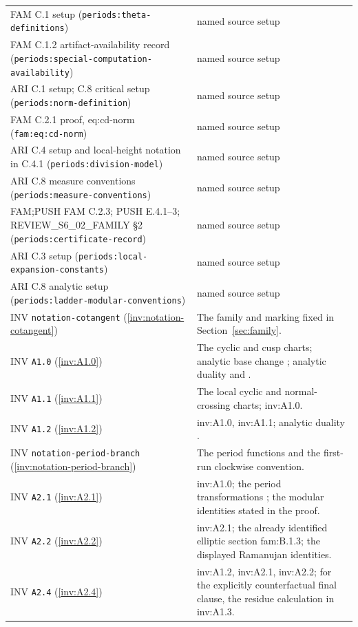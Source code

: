 \documentclass[11pt,a4paper]{article}
\theoremstyle{plain}
\theoremstyle{definition}
\begin{document}
\begin{longtable}{@{}L{.21\linewidth}L{.73\linewidth}@{}}
FAM C.1 setup (\nolinkurl{periods:theta-definitions}) & named source setup\\
FAM C.1.2 artifact-availability record (\nolinkurl{periods:special-computation-availability}) & named source setup\\
ARI C.1 setup; C.8 critical setup (\nolinkurl{periods:norm-definition}) & named source setup\\
FAM C.2.1 proof, eq:\allowbreak{}cd-norm (\nolinkurl{fam:eq:cd-norm}) & named source setup\\
ARI C.4 setup and local-height notation in C.4.1 (\nolinkurl{periods:division-model}) & named source setup\\
ARI C.8 measure conventions (\nolinkurl{periods:measure-conventions}) & named source setup\\
FAM;PUSH FAM C.2.3; PUSH E.4.1--3; REVIEW\_\allowbreak{}S6\_\allowbreak{}02\_\allowbreak{}FAMILY §2 (\nolinkurl{periods:certificate-record}) & named source setup\\
ARI C.3 setup (\nolinkurl{periods:local-expansion-constants}) & named source setup\\
ARI C.8 analytic setup (\nolinkurl{periods:ladder-modular-conventions}) & named source setup\\
INV \nolinkurl{notation-cotangent} (\ref{inv:notation-cotangent}) & The family and marking fixed in Section~\ref{sec:family}.\\
INV \nolinkurl{A1.0} (\ref{inv:A1.0}) & The cyclic and cusp charts; analytic base change \cite[III.4.10, III.4.12]{BS76}; analytic duality \cite[pp.~261, 264--266]{RRV71} and \cite[p.~91, Proposition~2]{RR70}.\\
INV \nolinkurl{A1.1} (\ref{inv:A1.1}) & The local cyclic and normal-crossing charts; inv:A1.0.\\
INV \nolinkurl{A1.2} (\ref{inv:A1.2}) & inv:A1.0, inv:A1.1; analytic duality \cite[pp.~261, 264--266]{RRV71}.\\
INV \nolinkurl{notation-period-branch} (\ref{inv:notation-period-branch}) & The period functions and the first-run clockwise convention.\\
INV \nolinkurl{A2.1} (\ref{inv:A2.1}) & inv:A1.0; the period transformations \cite[Definition 3.1 and Theorem 3.4(i)]{AC26}; the modular identities stated in the proof.\\
INV \nolinkurl{A2.2} (\ref{inv:A2.2}) & inv:A2.1; the already identified elliptic section fam:B.1.3; the displayed Ramanujan identities.\\
INV \nolinkurl{A2.4} (\ref{inv:A2.4}) & inv:A1.2, inv:A2.1, inv:A2.2; for the explicitly counterfactual final clause, the residue calculation in inv:A1.3.\\

\end{longtable}
\end{document}
